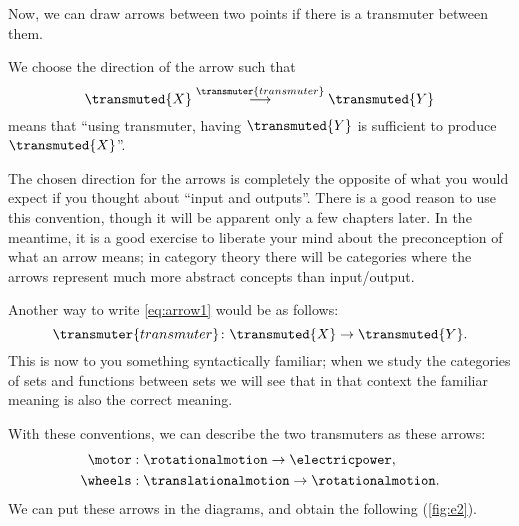 Now, we can draw arrows between two points if there is a transmuter between them.

We choose the direction of the arrow such that
\begin{equation}
  \label{eq:arrow1}
  \transmuted{X} \stackrel{\transmuter{transmuter}}{\longrightarrow} \transmuted{Y}
\end{equation}
means that ``using \textsf{transmuter}, having $\transmuted{Y}$ is sufficient to produce $\transmuted{X}$''.

\begin{remark}
  The chosen direction
  for the arrows is completely the opposite of what you would expect if you thought about
  ``input and outputs''. There is a good reason to use this convention, though it will
  be apparent only a few chapters later. In the meantime, it is a good exercise
  to liberate your mind about the preconception of what an arrow means; in category theory
  there will be categories where the arrows represent much more abstract concepts than input/output.
\end{remark}

Another way to write \cref{eq:arrow1} would be as follows:
\begin{equation}
  \transmuter{transmuter} \colon \transmuted{X} \to \transmuted{Y}.
\end{equation}
This is now to you something syntactically familiar; when we study the categories of sets and functions between sets we will see that in that context the familiar meaning is also the correct meaning.

With these conventions, we can describe the two transmuters as these arrows:
%
\begin{align}
  \motor&:  \rotationalmotion \rightarrow \electricpower, \\
  \wheels&: \translationalmotion \rightarrow \rotationalmotion.
\end{align}
%
We can put these arrows in the diagrams, and obtain
the following (\cref{fig:e2}).





